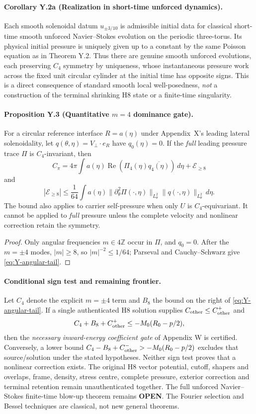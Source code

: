 \paragraph{Corollary Y.2a (Realization in short-time unforced dynamics).}
Each smooth solenoidal datum $u_{\pm3/10}$ is admissible initial data for classical short-time smooth unforced Navier--Stokes evolution on the periodic three-torus. Its physical initial pressure is uniquely given up to a constant by the same Poisson equation as in Theorem Y.2. Thus there are genuine smooth unforced evolutions, each preserving $C_4$ symmetry by uniqueness, whose instantaneous pressure work across the fixed unit circular cylinder at the initial time has opposite signs. This is a direct consequence of standard smooth local well-posedness, \emph{not} a construction of the terminal shrinking H8 state or a finite-time singularity.

\paragraph{Proposition Y.3 (Quantitative $m=4$ dominance gate).}
For a circular reference interface $R=a(\eta)$ under Appendix~X's leading lateral solenoidality, let $q(\theta,\eta)=V_\perp\cdot e_R$ have $q_0(\eta)=0$. If the \emph{full} leading pressure trace $\Pi$ is $C_4$-invariant, then
\[
C_\pi=4\pi\int a(\eta)\operatorname{Re}
(\Pi_4(\eta)\overline{q_4(\eta)})\,d\eta+\mathcal E_{\ge8}
\]
and
\begin{equation}\label{eq:Y-angular-tail}
\boxed{|\mathcal E_{\ge8}|\le\frac1{64}
\int a(\eta)\|\partial_\theta^2\Pi(\cdot,\eta)\|_{L^2_\theta}
\|q(\cdot,\eta)\|_{L^2_\theta}\,d\eta.}
\end{equation}
The bound also applies to carrier self-pressure when only $U$ is $C_4$-equivariant. It cannot be applied to \emph{full} pressure unless the complete velocity and nonlinear correction retain the symmetry.
\begin{proof}
Only angular frequencies $m\in4\mathbb Z$ occur in $\Pi$, and $q_0=0$. After the $m=\pm4$ modes, $|m|\ge8$, so $|m|^{-2}\le1/64$; Parseval and Cauchy--Schwarz give \eqref{eq:Y-angular-tail}.
\end{proof}

\paragraph{Conditional sign test and remaining frontier.}
Let $C_4$ denote the explicit $m=\pm4$ term and $B_8$ the bound on the right of \eqref{eq:Y-angular-tail}. If a single authenticated H8 solution supplies $C_{\rm other}\le C_{\rm other}^+$ and
\[
C_4+B_8+C_{\rm other}^+\le -M_0(R_0-p/2),
\]
then the \emph{necessary inward-energy coefficient gate} of Appendix W is certified. Conversely, a lower bound $C_4-B_8+C_{\rm other}^->-M_0(R_0-p/2)$ excludes that source/solution under the stated hypotheses. Neither sign test proves that a nonlinear correction exists. The original H8 vector potential, cutoff, shapers and overlaps, frame, density, stress centre, complete pressure, exterior correction and terminal retention remain unauthenticated together. The full unforced Navier--Stokes finite-time blow-up theorem remains \textbf{OPEN}. The Fourier selection and Bessel techniques are classical, not new general theorems.
